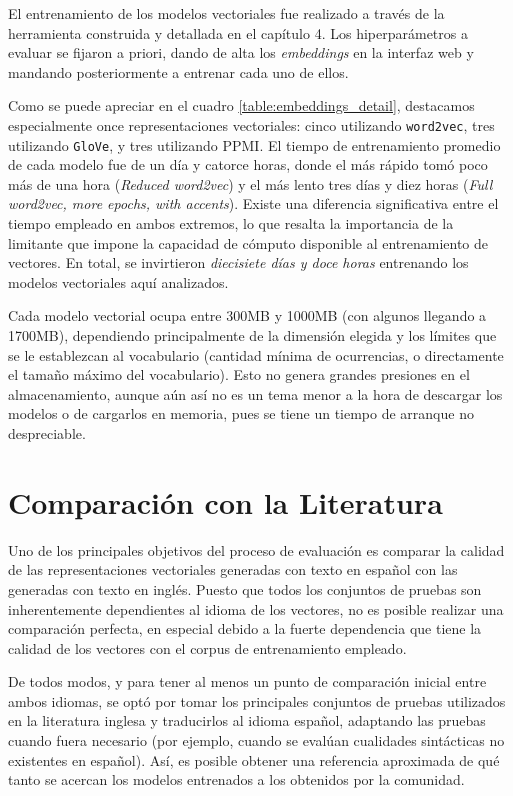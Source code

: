 El entrenamiento de los modelos vectoriales fue realizado a través de la herramienta construida y
detallada en el capítulo 4. Los hiperparámetros a evaluar se fijaron a priori, dando de alta los
\textit{embeddings} en la interfaz web y mandando posteriormente a entrenar cada uno de ellos.

Como se puede apreciar en el cuadro \ref{table:embeddings_detail}, destacamos especialmente once
representaciones vectoriales: cinco utilizando \texttt{word2vec}, tres utilizando \texttt{GloVe}, y
tres utilizando PPMI\@. El tiempo de entrenamiento promedio de cada modelo fue de un día y catorce
horas, donde el más rápido tomó poco más de una hora (\textit{Reduced word2vec}) y el más lento
tres días y diez horas (\textit{Full word2vec, more epochs, with accents}). Existe una diferencia
significativa entre el tiempo empleado en ambos extremos, lo que resalta la importancia de la
limitante que impone la capacidad de cómputo disponible al entrenamiento de vectores. En total, se
invirtieron \textit{diecisiete días y doce horas} entrenando los modelos vectoriales aquí analizados.

Cada modelo vectorial ocupa entre 300MB y 1000MB (con algunos llegando a 1700MB), dependiendo
principalmente de la dimensión elegida y los límites que se le establezcan al vocabulario (cantidad
mínima de ocurrencias, o directamente el tamaño máximo del vocabulario). Esto no genera grandes
presiones en el almacenamiento, aunque aún así no es un tema menor a la hora de descargar los
modelos o de cargarlos en memoria, pues se tiene un tiempo de arranque no despreciable.


\section{Comparación con la Literatura}

Uno de los principales objetivos del proceso de evaluación es comparar la calidad de las
representaciones vectoriales generadas con texto en español con las generadas con texto en
inglés. Puesto que todos los conjuntos de pruebas son inherentemente dependientes al idioma de los
vectores, no es posible realizar una comparación perfecta, en especial debido a la fuerte
dependencia que tiene la calidad de los vectores con el corpus de entrenamiento empleado.

De todos modos, y para tener al menos un punto de comparación inicial entre ambos idiomas, se optó
por tomar los principales conjuntos de pruebas utilizados en la literatura inglesa y traducirlos al
idioma español, adaptando las pruebas cuando fuera necesario (por ejemplo, cuando se evalúan
cualidades sintácticas no existentes en español). Así, es posible obtener una referencia aproximada
de qué tanto se acercan los modelos entrenados a los obtenidos por la comunidad.

